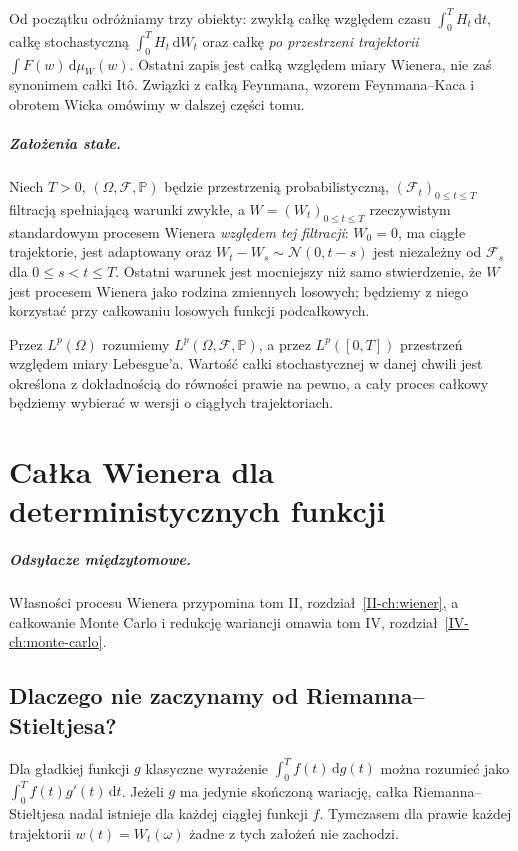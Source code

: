 \documentclass[11pt,a4paper,oneside]{report}
\numberwithin{equation}{chapter}
\theoremstyle{plain}
\theoremstyle{definition}
\theoremstyle{remark}
\newcommand{\Prob}{\mathbb{P}}
\newcommand{\calF}{\mathcal{F}}
\newcommand{\dd}{\mathrm{d}}
\newcommand{\Normal}{\mathcal{N}}
\begin{document}
Od początku odróżniamy trzy obiekty: zwykłą całkę względem czasu
$\int_0^T H_t\,\dd t$, całkę stochastyczną
$\int_0^T H_t\,\dd W_t$ oraz całkę \emph{po przestrzeni trajektorii}
$\int F(w)\,\dd\mu_W(w)$. Ostatni zapis jest całką względem miary
Wienera, nie zaś synonimem całki Itô. Związki z całką Feynmana,
wzorem Feynmana--Kaca i obrotem Wicka omówimy w dalszej części tomu.

\paragraph{Założenia stałe.}
Niech $T>0$, $(\Omega,\calF,\Prob)$ będzie przestrzenią probabilistyczną,
$(\calF_t)_{0\le t\le T}$ filtracją spełniającą warunki zwykłe,
a $W=(W_t)_{0\le t\le T}$ rzeczywistym standardowym procesem Wienera
\emph{względem tej filtracji}: $W_0=0$, ma ciągłe trajektorie,
jest adaptowany oraz $W_t-W_s\sim\Normal(0,t-s)$ jest niezależny
od $\calF_s$ dla $0\le s<t\le T$. Ostatni warunek jest mocniejszy
niż samo stwierdzenie, że $W$ jest procesem Wienera jako rodzina
zmiennych losowych; będziemy z niego korzystać przy całkowaniu
losowych funkcji podcałkowych.

Przez $L^p(\Omega)$ rozumiemy $L^p(\Omega,\calF,\Prob)$,
a przez $L^p([0,T])$ przestrzeń względem miary Lebesgue'a.
Wartość całki stochastycznej w danej chwili jest określona z dokładnością
do równości prawie na pewno, a cały proces całkowy będziemy wybierać
w wersji o ciągłych trajektoriach.

\chapter{Całka Wienera dla deterministycznych funkcji}
\label{ch:wiener-integral}
\paragraph{Odsyłacze międzytomowe.} Własności procesu Wienera przypomina tom II, rozdział~\ref{II-ch:wiener}, a całkowanie Monte Carlo i redukcję wariancji omawia tom IV, rozdział~\ref{IV-ch:monte-carlo}.

\section{Dlaczego nie zaczynamy od Riemanna--Stieltjesa?}
Dla gładkiej funkcji $g$ klasyczne wyrażenie
$\int_0^T f(t)\,\dd g(t)$ można rozumieć jako
$\int_0^T f(t)g'(t)\,\dd t$. Jeżeli $g$ ma jedynie
skończoną wariację, całka Riemanna--Stieltjesa nadal istnieje
dla każdej ciągłej funkcji $f$. Tymczasem dla prawie każdej
trajektorii $w(t)=W_t(\omega)$ żadne z tych założeń nie zachodzi.
\end{document}
